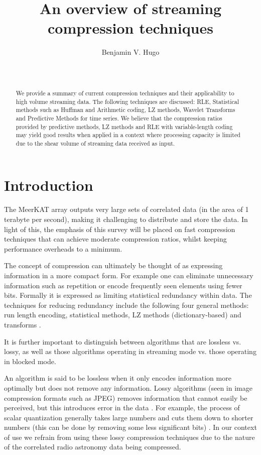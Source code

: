 \documentclass{acm_proc_article-sp}
\title{An overview of streaming compression techniques}
\author{
\alignauthor
Benjamin V. Hugo\\
       \affaddr{Department of Computer Science}\\
       \affaddr{University of Cape Town}\\
       \email{bennahugo@aol.com}
}
\begin{document}
\maketitle
\begin{abstract}
 We provide a summary of current compression techniques and their applicability to high volume streaming data. The following techniques are discussed: RLE, 
 Statistical methods such as Huffman and Arithmetic coding, LZ methods, Wavelet Transforms and Predictive Methods for time series. We believe that the compression
 ratios provided by predictive methods, LZ methods and RLE with variable-length coding may yield good results when applied in a context where processing capacity is limited
 due to the shear volume of streaming data received as input.
\end{abstract}

\section{Introduction}
The MeerKAT array outputs very large sets of correlated data (in the area of 1 terabyte per second), making it challenging to distribute and store the data. In light of this, the emphasis of 
this survey will be placed on fast compression techniques that can achieve moderate compression ratios, whilst keeping performance overheads to a minimum.

The concept of compression can ultimately be thought of as expressing information in a more compact form. For example one can eliminate unnecessary information such as repetition 
or encode frequently seen elements using fewer bits. Formally it is expressed as limiting statistical redundancy within data. The techniques for reducing redundancy include the 
following four general methods: run length encoding, statistical methods, LZ methods (dictionary-based) and transforms \cite[p. 7]{salomon2004data}.

It is further important to distinguish between algorithms that are lossless vs. lossy, as well as
those algorithms operating in streaming mode vs. those operating in blocked mode.

An algorithm is said to be lossless when it only encodes information more optimally but does not remove any information.
Lossy algorithms (seen in image compression formats such as JPEG) removes information that 
cannot easily be perceived, but this introduces error in the data \cite[p. 8]{salomon2004data}. For example, the process of scalar 
quantization generally takes large numbers and cuts them down to shorter numbers (this can be done by removing some less 
significant bits) \cite[p. 40]{salomon2004data}. In our context of use we refrain from using these lossy compression techniques due to the 
nature of the correlated radio astronomy data being compressed.
\end{document}
